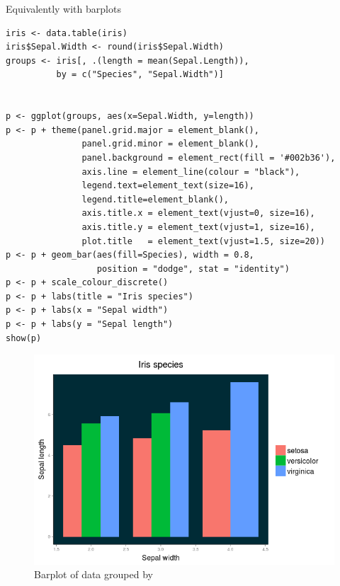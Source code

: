 Equivalently with barplots
\begin{verbatim}
iris <- data.table(iris)
iris$Sepal.Width <- round(iris$Sepal.Width)
groups <- iris[, .(length = mean(Sepal.Length)), 
		  by = c("Species", "Sepal.Width")]


p <- ggplot(groups, aes(x=Sepal.Width, y=length))
p <- p + theme(panel.grid.major = element_blank(), 
               panel.grid.minor = element_blank(),
               panel.background = element_rect(fill = '#002b36'),
               axis.line = element_line(colour = "black"),
               legend.text=element_text(size=16),
               legend.title=element_blank(),
               axis.title.x = element_text(vjust=0, size=16),
               axis.title.y = element_text(vjust=1, size=16),
               plot.title   = element_text(vjust=1.5, size=20)) 
p <- p + geom_bar(aes(fill=Species), width = 0.8, 
                  position = "dodge", stat = "identity")
p <- p + scale_colour_discrete()
p <- p + labs(title = "Iris species")
p <- p + labs(x = "Sepal width")
p <- p + labs(y = "Sepal length")
show(p)
\end{verbatim}
\begin{figure}[htbp]
 \centering
 \includegraphics[scale = .5]{images/grouped_barplot}
 \caption*{Barplot of data grouped by}
\end{figure}

